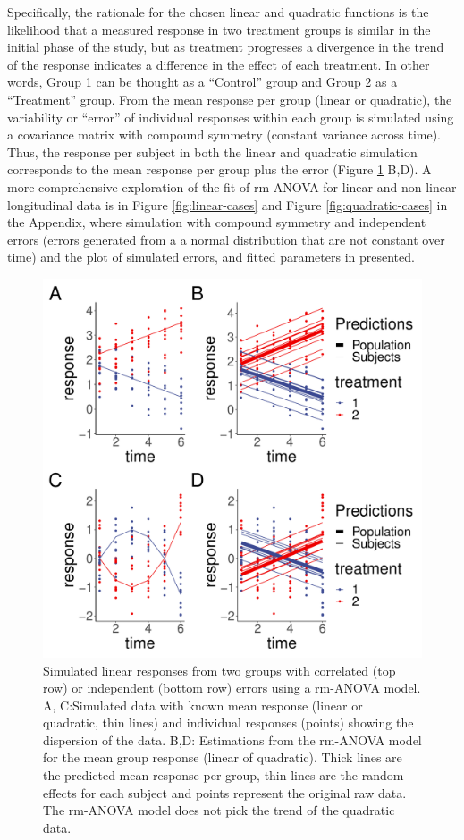 \documentclass[
]{article}
\begin{document}
Specifically, the rationale for the chosen linear and quadratic functions is the likelihood that a measured response in two treatment groups is similar in the initial phase of the study, but as treatment progresses a divergence in the trend of the response indicates a difference in the effect of each treatment. In other words, Group 1 can be thought as a ``Control'' group and Group 2 as a ``Treatment'' group. From the mean response per group (linear or quadratic), the variability or ``error'' of individual responses within each group is simulated using a covariance matrix with compound symmetry (constant variance across time). Thus, the response per subject in both the linear and quadratic simulation corresponds to the mean response per group plus the error (Figure \ref{fig:l-q-response} B,D). A more comprehensive exploration of the fit of rm-ANOVA for linear and non-linear longitudinal data is in Figure \ref{fig:linear-cases} and Figure \ref{fig:quadratic-cases} in the Appendix, where simulation with compound symmetry and independent errors (errors generated from a a normal distribution that are not constant over time) and the plot of simulated errors, and fitted parameters in presented.

\begin{figure}[!h]

{\centering \includegraphics[width=0.75\linewidth,]{Manuscript_AM_v4_files/figure-latex/l-q-response-1} 

}

\caption{Simulated linear responses from two groups with correlated (top row) or independent (bottom row) errors using a rm-ANOVA model. A, C:Simulated data with known mean response (linear or quadratic, thin lines) and individual responses (points) showing the dispersion of the data. B,D: Estimations from the rm-ANOVA model for the mean group response (linear of quadratic). Thick lines are the predicted mean response per group, thin lines are the random effects for each subject and points represent the original raw data. The rm-ANOVA model does not pick the trend of the quadratic data.}\label{fig:l-q-response}
\end{figure}
\end{document}
